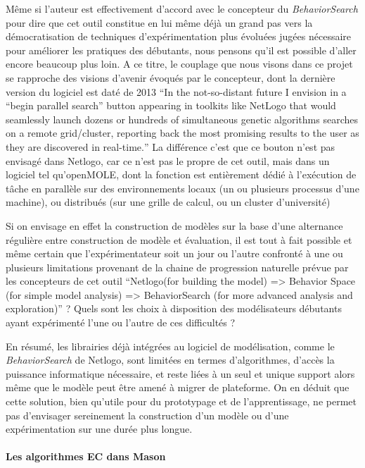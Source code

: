 Même si l'auteur est effectivement d'accord avec le concepteur du \textit{BehaviorSearch} pour dire que cet outil constitue en lui même déjà un grand pas vers la démocratisation de techniques d'expérimentation plus évoluées jugées nécessaire pour améliorer les pratiques des débutants, nous pensons qu'il est possible d'aller encore beaucoup plus loin. A ce titre, le couplage que nous visons dans ce projet se rapproche des visions d'avenir évoqués par le concepteur, dont la dernière version du logiciel est daté de 2013 \textcite[295]{Stonedahl2011a} \foreignquote{english}{In the not-so-distant future I envision in a “begin parallel search” button appearing in toolkits like NetLogo that would seamlessly launch dozens or hundreds of simultaneous genetic algorithms searches on a remote grid/cluster, reporting back the most promising results to the user as they are discovered in real-time.} La différence c'est que ce bouton n'est pas envisagé dans Netlogo, car ce n'est pas le propre de cet outil, mais dans un logiciel tel qu'openMOLE, dont la fonction est entièrement dédié à l'exécution de tâche en parallèle sur des environnements locaux (un ou plusieurs processus d'une machine), ou distribués (sur une grille de calcul, ou un cluster d'université)

Si on envisage en effet la construction de modèles sur la base d'une alternance régulière entre construction de modèle et évaluation, il est tout à fait possible et même certain que l'expérimentateur soit un jour ou l'autre confronté à une ou plusieurs limitations provenant de la chaine de progression naturelle prévue par les concepteurs de cet outil \foreignquote{english}{Netlogo(for building the model) => Behavior Space (for simple model analysis) => BehaviorSearch (for more advanced analysis and exploration)} \autocite[340]{Stonedahl2011a} ? Quels sont les choix à disposition des modélisateurs débutants ayant expérimenté l'une ou l'autre de ces difficultés ? 

En résumé, les librairies déjà intégrées au logiciel de modélisation, comme le \textit{BehaviorSearch} de Netlogo, sont limitées en termes d'algorithmes, d'accès la puissance informatique nécessaire, et reste liées à un seul et unique support alors même que le modèle peut être amené à migrer de plateforme. On en déduit que cette solution, bien qu'utile pour du prototypage et de l'apprentissage, ne permet pas d'envisager sereinement la construction d'un modèle ou d'une expérimentation sur une durée plus longue.

\paragraph{Les algorithmes EC dans Mason}

